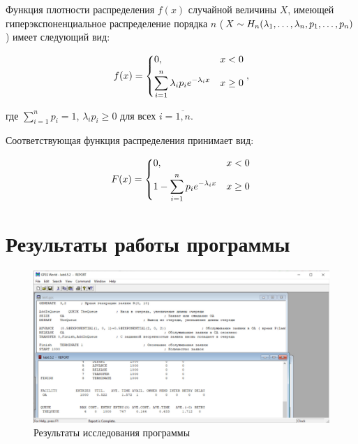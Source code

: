 \documentclass[14pt, a4paper]{extarticle}
\begin{document}
Функция плотности распределения $f(x)$ случайной величины $X$, имеющей гиперэкспоненциальное распределение порядка $n$ ($X \sim H_n(\lambda_1, \dots, \lambda_n,\\ p_1, \dots, p_n)$) имеет следующий вид:

\begin{equation}
	f(x) = \begin{dcases}
		0, & x < 0\\
		\sum_{i=1}^{n}\lambda_ip_ie^{-\lambda_ix} & x \ge 0\\
	\end{dcases},
\end{equation}


где $\sum_{i=1}^np_i = 1$, $\lambda_ip_i \ge 0$ для всех $i=\overline{1, n}$.

Соответствующая функция распределения принимает вид:

\begin{equation}
	F(x)= \begin{dcases}
		0, & x < 0\\
		1-\sum_{i=1}^{n}p_ie^{-\lambda_ix} & x \ge 0\\
	\end{dcases}
\end{equation}


\section{Результаты работы программы}



\begin{figure}[h]
	\begin{center}
		{\includegraphics[scale=0.47]{pictures/demo.jpg}
			\caption{Результаты исследования программы}
			\label{pic:1}}
	\end{center}
\end{figure}
\end{document}
